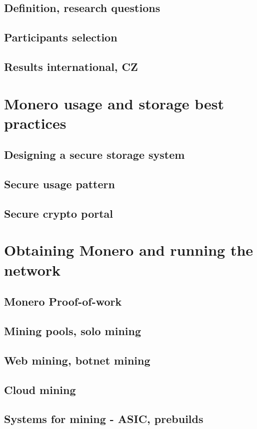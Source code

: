 \documentclass[
  printed, %
  table,   %
  nolof,     %
  nolot,     %
           oneside, color
]{fithesis3}
\begin{document}
\section{Definition, research questions}
\section{Participants selection}
\section{Results international, CZ}

\chapter{Monero usage and storage best practices}
\section{Designing a secure storage system}
\section{Secure usage pattern}
\section{Secure crypto portal}



\chapter{Obtaining Monero and running the network}
\section{Monero Proof-of-work}
\section{Mining pools, solo mining}
\section{Web mining, botnet mining}
\section{Cloud mining}
\section{Systems for mining - ASIC, prebuilds}
\end{document}
